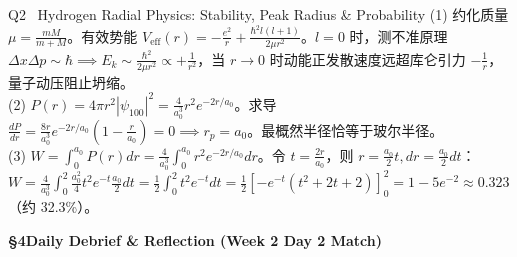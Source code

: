 \documentclass[a4paper,11pt]{article}
\begin{document}
\begin{solution}{Q2 \textperiodcentered\ Hydrogen Radial Physics: Stability, Peak Radius \& Probability}
(1) 约化质量 $\mu = \frac{mM}{m+M}$。有效势能 $V_{\text{eff}}(r) = -\frac{e^2}{r} + \frac{\hbar^2 l(l+1)}{2\mu r^2}$。$l=0$ 时，测不准原理 $\Delta x\Delta p \sim \hbar \implies E_k \sim \frac{\hbar^2}{2\mu r^2} \propto +\frac{1}{r^2}$，当 $r\to 0$ 时动能正发散速度远超库仑引力 $-\frac{1}{r}$，量子动压阻止坍缩。\\
(2) $P(r) = 4\pi r^2 |\psi_{100}|^2 = \frac{4}{a_0^3} r^2 e^{-2r/a_0}$。求导 $\frac{dP}{dr} = \frac{8r}{a_0^3}e^{-2r/a_0}(1 - \frac{r}{a_0}) = 0 \implies r_p = a_0$。最概然半径恰等于玻尔半径。\\
(3) $W = \int_0^{a_0} P(r)dr = \frac{4}{a_0^3} \int_0^{a_0} r^2 e^{-2r/a_0} dr$。令 $t = \frac{2r}{a_0}$，则 $r = \frac{a_0}{2}t, dr = \frac{a_0}{2}dt$：\\
$W = \frac{4}{a_0^3} \int_0^2 \frac{a_0^2}{4}t^2 e^{-t} \frac{a_0}{2}dt = \frac{1}{2} \int_0^2 t^2 e^{-t} dt = \frac{1}{2} \left[ -e^{-t}(t^2 + 2t + 2) \right]_0^2 = 1 - 5e^{-2} \approx 0.323$（约 32.3\%）。
\end{solution}

\clearpage

{\Large\sffamily\bfseries\color{navy} \S 4\quad Daily Debrief \& Reflection (Week 2 Day 2 Match)}

\vspace{4pt}
\end{document}
